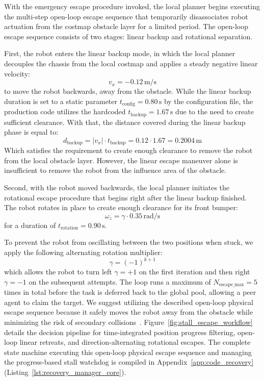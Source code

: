 With the emergency escape procedure invoked, the local planner begins executing the multi-step open-loop escape sequence that temporarily disassociates robot actuation from the costmap obstacle layer for a limited period. The open-loop escape sequence consists of two stages: linear backup and rotational separation.

First, the robot enters the linear backup mode, in which the local planner decouples the chassis from the local costmap and applies a steady negative linear velocity:
\begin{equation} v_x = -0.12\,\text{m/s} \label{eq:escape_linear_velocity} \end{equation}
to move the robot backwards, away from the obstacle. While the linear backup duration is set to a static parameter $t_{\text{config}} = 0.80\,\text{s}$ by the configuration file, the production code utilizes the hardcoded $t_{\text{backup}} = 1.67\,\text{s}$ due to the need to create sufficient clearance. With that, the distance covered during the linear backup phase is equal to:
\begin{equation} d_{\text{backup}} = \lvert v_x \rvert \cdot t_{\text{backup}} = 0.12 \cdot 1.67 = 0.2004\,\text{m} \label{eq:exact_retreat_distance} \end{equation}
Which satisfies the requirement to create enough clearance to remove the robot from the local obstacle layer. However, the linear escape maneuver alone is insufficient to remove the robot from the influence area of the obstacle.

Second, with the robot moved backwards, the local planner initiates the rotational escape procedure that begins right after the linear backup finished. The robot rotates in place to create enough clearance for its front bumper:
\begin{equation} \omega_z = \gamma \cdot 0.35\,\text{rad/s} \label{eq:escape_rotational_velocity} \end{equation}
for a duration of $t_{\text{rotation}} = 0.90\,\text{s}$.

To prevent the robot from oscillating between the two positions when stuck, we apply the following alternating rotation multiplier:
\begin{equation} \gamma = (-1)^{k+1} \label{eq:alternating_direction_multiplier} \end{equation}
which allows the robot to turn left $\gamma = +1$ on the first iteration and then right $\gamma = -1$ on the subsequent attempts. The loop runs a maximum of $N_{\text{escape\_max}} = 5$ times in total before the task is deferred back to the global pool, allowing a peer agent to claim the target. We suggest utilizing the described open-loop physical escape sequence because it safely moves the robot away from the obstacle while minimizing the risk of secondary collisions~\cite{tang2025path}. Figure~\ref{fig:stall_escape_workflow} details the decision pipeline for time-integrated position progress filtering, open-loop linear retreats, and direction-alternating rotational escapes. The complete state machine executing this open-loop physical escape sequence and managing the progress-based stall watchdog is compiled in Appendix~\ref{app:code_recovery} (Listing~\ref{lst:recovery_manager_core}).

